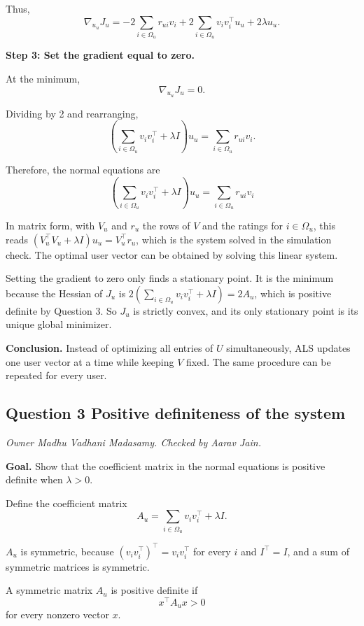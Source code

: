 Thus,
\[
\nabla_{u_u}J_u
=
-2\sum_{i\in\Omega_u}r_{ui}v_i
+2\sum_{i\in\Omega_u}v_iv_i^\top u_u
+2\lambda u_u.
\]

\textbf{Step 3: Set the gradient equal to zero.}

At the minimum,
\[
\nabla_{u_u}J_u=0.
\]

Dividing by 2 and rearranging,
\[
\left(
\sum_{i\in\Omega_u}v_iv_i^\top
+\lambda I
\right)u_u
=
\sum_{i\in\Omega_u}r_{ui}v_i.
\]

Therefore, the normal equations are
\[
\boxed{
\left(
\sum_{i\in\Omega_u}v_iv_i^\top
+\lambda I
\right)u_u
=
\sum_{i\in\Omega_u}r_{ui}v_i
}
\]

In matrix form, with $V_u$ and $r_u$ the rows of $V$ and the
ratings for $i\in\Omega_u$, this reads
$(V_u^\top V_u+\lambda I)u_u=V_u^\top r_u$, which is the system
solved in the simulation check. The optimal user vector can be
obtained by solving this linear system.

Setting the gradient to zero only finds a stationary point. It
is the minimum because the Hessian of $J_u$ is
$2\left(\sum_{i\in\Omega_u}v_iv_i^\top+\lambda I\right)=2A_u$,
which is positive definite by Question 3. So $J_u$ is strictly
convex, and its only stationary point is its unique global
minimizer.

\textbf{Conclusion.} Instead of optimizing all entries of
$U$ simultaneously, ALS updates one user vector at a time
while keeping $V$ fixed. The same procedure can be repeated
for every user.

\subsection*{Question 3 Positive definiteness of the system}
\textit{Owner Madhu Vadhani Madasamy. Checked by Aarav Jain.}

\textbf{Goal.} Show that the coefficient matrix in the
normal equations is positive definite when $\lambda>0$.

Define the coefficient matrix
\[
A_u=
\sum_{i\in\Omega_u}v_iv_i^\top+\lambda I.
\]

$A_u$ is symmetric, because $(v_iv_i^\top)^\top=v_iv_i^\top$
for every $i$ and $I^\top=I$, and a sum of symmetric matrices is
symmetric.

A symmetric matrix $A_u$ is positive definite if
\[
x^\top A_ux>0
\]
for every nonzero vector $x$.

